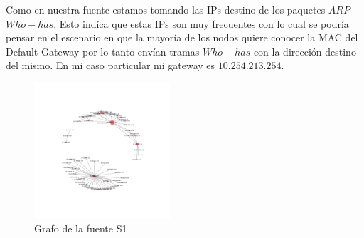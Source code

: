 Como en nuestra fuente estamos tomando las IPs destino de los paquetes $ARP$ $Who-has$. Esto indíca que estas IPs son muy frecuentes con lo cual se podría pensar en el escenario en que la mayoría de los nodos quiere conocer la MAC del Default Gateway por lo tanto envían tramas $Who-has$ con la dirección destino del mismo. En mi caso particular mi gateway es $10.254.213.254$.


\begin{figure}[h]
  \centering
    \includegraphics[width=0.45\textwidth]{grafo_red_despegar.png}
  \caption{Grafo de la fuente S1}
  \label{grafo-s1}
\end{figure}